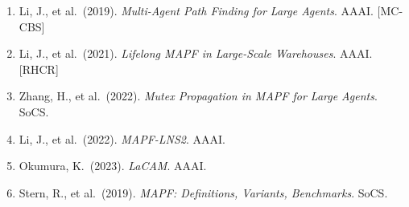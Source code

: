 \documentclass[12pt, a4paper]{article}
\begin{document}
\begin{enumerate}
    \item Li, J., et al.\ (2019). \emph{Multi-Agent Path Finding for Large Agents}. AAAI. [MC-CBS]
    \item Li, J., et al.\ (2021). \emph{Lifelong MAPF in Large-Scale Warehouses}. AAAI. [RHCR]
    \item Zhang, H., et al.\ (2022). \emph{Mutex Propagation in MAPF for Large Agents}. SoCS.
    \item Li, J., et al.\ (2022). \emph{MAPF-LNS2}. AAAI.
    \item Okumura, K.\ (2023). \emph{LaCAM}. AAAI.
    \item Stern, R., et al.\ (2019). \emph{MAPF: Definitions, Variants, Benchmarks}. SoCS.
\end{enumerate}
\end{document}
